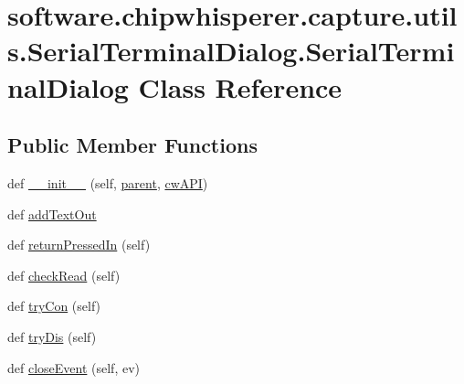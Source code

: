 \hypertarget{classsoftware_1_1chipwhisperer_1_1capture_1_1utils_1_1SerialTerminalDialog_1_1SerialTerminalDialog}{}\section{software.\+chipwhisperer.\+capture.\+utils.\+Serial\+Terminal\+Dialog.\+Serial\+Terminal\+Dialog Class Reference}
\label{classsoftware_1_1chipwhisperer_1_1capture_1_1utils_1_1SerialTerminalDialog_1_1SerialTerminalDialog}
\subsection*{Public Member Functions}
\begin{DoxyCompactItemize}
\item 
def \hyperlink{classsoftware_1_1chipwhisperer_1_1capture_1_1utils_1_1SerialTerminalDialog_1_1SerialTerminalDialog_a3df18363b80e15dccda9108c3b2bbded}{\+\_\+\+\_\+init\+\_\+\+\_\+} (self, \hyperlink{classsoftware_1_1chipwhisperer_1_1capture_1_1utils_1_1SerialTerminalDialog_1_1SerialTerminalDialog_a8ced666bf19c9e5ffe932e0f282b862c}{parent}, \hyperlink{classsoftware_1_1chipwhisperer_1_1capture_1_1utils_1_1SerialTerminalDialog_1_1SerialTerminalDialog_a2b490843a6325ac6bb25cb43238aa2ac}{cw\+A\+P\+I})
\item 
def \hyperlink{classsoftware_1_1chipwhisperer_1_1capture_1_1utils_1_1SerialTerminalDialog_1_1SerialTerminalDialog_ad0e6ce526f122c2e961e5f1450a9b9c3}{add\+Text\+Out}
\item 
def \hyperlink{classsoftware_1_1chipwhisperer_1_1capture_1_1utils_1_1SerialTerminalDialog_1_1SerialTerminalDialog_a5a083f47c0b5667417f19173214d7d6d}{return\+Pressed\+In} (self)
\item 
def \hyperlink{classsoftware_1_1chipwhisperer_1_1capture_1_1utils_1_1SerialTerminalDialog_1_1SerialTerminalDialog_a9d6e5ad2f7d9db58b92e1ec061c88176}{check\+Read} (self)
\item 
def \hyperlink{classsoftware_1_1chipwhisperer_1_1capture_1_1utils_1_1SerialTerminalDialog_1_1SerialTerminalDialog_abbca67e3e27700aca6c5612257fedece}{try\+Con} (self)
\item 
def \hyperlink{classsoftware_1_1chipwhisperer_1_1capture_1_1utils_1_1SerialTerminalDialog_1_1SerialTerminalDialog_a35463a2267fb892451dae44436f4da93}{try\+Dis} (self)
\item 
def \hyperlink{classsoftware_1_1chipwhisperer_1_1capture_1_1utils_1_1SerialTerminalDialog_1_1SerialTerminalDialog_ab26a0b5934621a132d37360e9e5ff16d}{close\+Event} (self, ev)
\end{DoxyCompactItemize}
